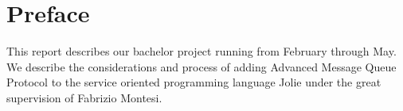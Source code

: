 \section{Preface}
This report describes our bachelor project running from February through May. We describe the considerations and process of adding Advanced Message Queue Protocol to the service oriented programming language Jolie under the great supervision of Fabrizio Montesi.
\newpage